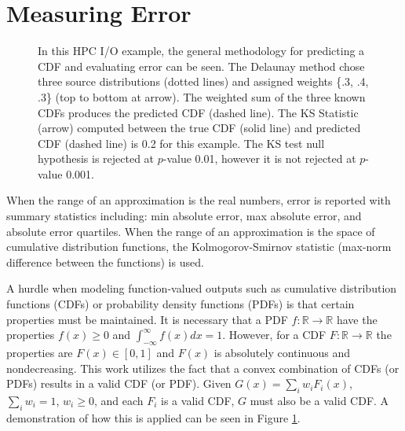 \documentclass[smallextended,final]{svjour3}  %
\begin{document}
\section{Measuring Error}
\label{sec:error}

\begin{figure}[htb]
  \centering
  \vspace{-0.3cm}
  \caption{In this HPC I/O example, the general methodology for
    predicting a CDF and evaluating error can be seen. The Delaunay
    method chose three source distributions (dotted lines) and
    assigned weights \{.3, .4, .3\} (top to bottom at arrow). The
    weighted sum of the three known CDFs produces the predicted CDF
    (dashed line). The KS Statistic (arrow) computed between the true
    CDF (solid line) and predicted CDF (dashed line) is 0.2 for this
    example. The KS test null hypothesis is rejected at $p$-value
    0.01, however it is not rejected at $p$-value 0.001.
  \vspace{-.1cm}}
  \label{fig:prediction-example}
\end{figure}

When the range of an approximation is the real numbers, error is
reported with summary statistics including: min absolute error, max
absolute error, and absolute error quartiles. When the range of an
approximation is the space of cumulative distribution functions, the
Kolmogorov-Smirnov statistic (max-norm difference between the
functions) is used.

A hurdle when modeling function-valued outputs such as cumulative
distribution functions (CDFs) or probability density functions (PDFs)
is that certain properties must be maintained. It is necessary that a
PDF $f: \mathbb{R} \rightarrow \mathbb{R}$ have the properties $f(x)
\geq 0$ and $\int_{-\infty}^{\infty}f(x)dx = 1$. However, for a CDF
$F: \mathbb{R} \rightarrow \mathbb{R}$ the properties are
$F(x) \in [0,1]$ and $F(x)$ is absolutely continuous and
nondecreasing. This work utilizes the fact that a convex combination
of CDFs (or PDFs) results in a valid CDF (or PDF). Given $G(x) =
\sum_{i}w_i F_i(x)$, $\sum_{i} w_i = 1$, $w_i \geq 0$, and each $F_i$
is a valid CDF, $G$ must also be a valid CDF. A demonstration of how
this is applied can be seen in Figure \ref{fig:prediction-example}.
\end{document}
